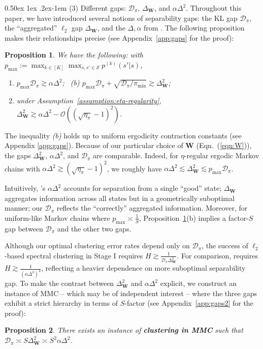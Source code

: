 \documentclass[twoside]{article}
\makeatletter
\renewcommand{\paragraph}{%
  \@startsection{paragraph}{4}%
  {\z@}{0.50ex \@plus 1ex \@minus .2ex}{-1em}%
  {\normalfont\normalsize\bfseries}%
}
\def\eqref#1{(\ref{#1})}
\def\mW{{\bm{W}}}
\def\gD{{\mathcal{D}}}
\def\gO{{\mathcal{O}}}
\def\gS{{\mathcal{S}}}
\theoremstyle{plain}
\newtheorem{proposition}{Proposition}[section]
\makeatother
\begin{document}
\paragraph{(3) Different gaps: $\gD_\pi$, $\Delta_\mW$, and $\alpha \Delta^2$.}
Throughout this paper, we have introduced several notions of separability gaps: the KL gap $\gD_\pi$, the ``aggregated'' $\ell_2$ gap $\Delta_\mW$, and the $\Delta, \alpha$ from \citet{kausik2023mixture}.
The following proposition makes their relationships precise (see Appendix~\ref{app:gaps} for the proof):
\begin{proposition}
\label{prop:gaps}
    We have the following: with $p_{\max} := \max_{k \in [K]} \max_{s, s' \in \gS} p^{(k)}(s' | s)$, 
    \begin{enumerate}
        \item[(a)] $p_{\max} \gD_\pi \gtrsim \alpha \Delta^2$; \ (b) $p_{\max} \gD_\pi + \sqrt{\gD_\pi / \pi_{\min}} \gtrsim \Delta_\mW^2$;
        
        \item[(c)] under Assumption~\ref{assumption:eta-regularity}, $\Delta_\mW^2 \gtrsim \alpha \Delta^2 - \gO((\sqrt{\eta_\pi} - 1)^2)$.
    \end{enumerate}
\end{proposition}
The inequality {\it (b)} holds up to uniform ergodicity contraction constants (see Appendix \ref{app:gaps}).
Because of our particular choice of $\mW$ (Eqn.~\eqref{eqn:W}), the gaps $\Delta_\mW^2$, $\alpha \Delta^2$, and $\gD_\pi$ are comparable.
Indeed, for $\eta$-regular ergodic Markov chains with $\alpha\Delta^2 \gtrsim (\sqrt{\eta_\pi} - 1)^2$, we roughly have $\alpha \Delta^2 \lesssim \Delta_\mW^2 \lesssim p_{\max} \gD_\pi$.

Intuitively, \citet{kausik2023mixture}'s $\alpha \Delta^2$ accounts for separation from a single ``good'' state; $\Delta_\mW$ aggregates information across all states but in a geometrically suboptimal manner; our $\gD_\pi$ reflects the ``correctly'' aggregated information.
Moreover, for uniform-like Markov chains where $p_{\max} \asymp \frac{1}{S}$, Proposition~\ref{prop:gaps}(b) implies a factor-$S$ gap between $\gD_\pi$ and the other two gaps.

Although our optimal clustering error rates depend only on $\gD_\pi$, the success of $\ell_2$-based spectral clustering in Stage I requires $H \gtrsim \frac{1}{\gD_\pi \Delta_\mW^2}$.
For comparison, \citet{kausik2023mixture} requires $H \gtrsim \frac{1}{(\alpha \Delta^2)^3}$, reflecting a heavier dependence on more suboptimal separability gap.
To make the contrast between $\Delta_\mW^2$ and $\alpha\Delta^2$ explicit, we construct an instance of MMC -- which may be of independent interest -- where the three gaps exhibit a strict hierarchy in terms of $S$-factor (see Appendix~\ref{app:gaps2} for the proof):
\begin{proposition}
\label{prop:separation-Delta}
    There exists an instance of \textbf{clustering in MMC} such that $\gD_\pi \asymp S \Delta_\mW^2 \asymp S^2 \alpha \Delta^2$.
\end{proposition}
\end{document}

